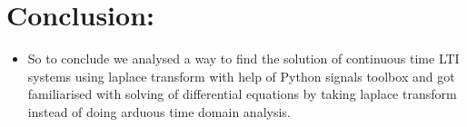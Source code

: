 \documentclass[11pt, a4paper]{article}
\begin{document}
    \section{Conclusion:}\label{conclusion}

    \begin{itemize}
    \item
      So to conclude we analysed a way to find the solution of continuous
      time LTI systems using laplace transform with help of Python signals
      toolbox and got familiarised with solving of differential equations by
      taking laplace transform instead of doing arduous time domain
      analysis.
    \end{itemize}
    
      
\end{document}
